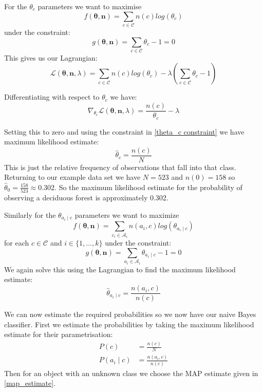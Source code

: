 For the $\theta_c$ parameters we want to maximise
\begin{equation}
	f(\bm{\theta}, \mathbf{n}) = \sum_{c \in \mathcal{C}}  n(c)log(\theta_c)
\end{equation}
under the constraint:
\begin{equation}\label{theta_c constraint}
	g(\bm{\theta}, \mathbf{n}) = \sum_{c \in \mathcal{C}}  \theta_c - 1 = 0
\end{equation}
This gives us our Lagrangian:
\begin{equation}
	\mathcal{L}(\bm{\theta}, \mathbf{n}, \lambda) = \sum_{c \in \mathcal{C}}  n(c)log(\theta_c) - \lambda(\sum_{c \in \mathcal{C}}  \theta_c - 1)
\end{equation}

Differentiating with respect to $\theta_c$ we have:
\begin{equation}
	\nabla_{\theta_c} \mathcal{L}(\bm{\theta}, \mathbf{n}, \lambda) = \frac{n(c)}{\theta_c} - \lambda
\end{equation}

Setting this to zero and using the constraint in \cref{theta_c constraint} we have maximum likelihood estimate:
\begin{equation}
	\hat\theta_c = \frac{n(c)}{N}
\end{equation}
This is just the relative frequency of observations that fall into that class.
Returning to our example data set we have $N=523$ and $n(0)=158$ so $\hat\theta_0 = \frac{158}{523} \approx 0.302$.
So the maximum likelihood estimate for the probability of observing a deciduous forest is approximately 0.302.

Similarly for the $\theta_{a_i \mid c}$ parameters we want to maximize
\begin{equation}
	f(\bm{\theta}, \mathbf{n}) = \sum_{c_i \in \mathcal{A}_i} n(a_i, c) log(\theta_{a_i \mid c})
\end{equation}
for each $c \in \mathcal{C}$ and $i \in \{1,\dots,k\}$ under the constraint:
\begin{equation}
	g(\bm{\theta}, \mathbf{n}) = \sum_{a_i \in \mathcal{A}_i}  \theta_{a_i \mid c} - 1 = 0
\end{equation}
We again solve this using the Lagrangian to find the maximum likelihood estimate:
\begin{equation}
	\hat\theta_{a_i \mid c} = \frac{n(a_i, c)}{n(c)}
\end{equation}

We can now estimate the required probabilities so we now have our naive Bayes classifier.
First we estimate the probabilities by taking the maximum likelihood estimate for their parametrisation:
\begin{align}
	P(c) & = \frac{n(c)}{N} \\
	P(a_i \mid c) & = \frac{n(a_i, c)}{n(c)}
\end{align}
Then for an object with an unknown class we choose the MAP estimate given in \cref{map_estimate}.

